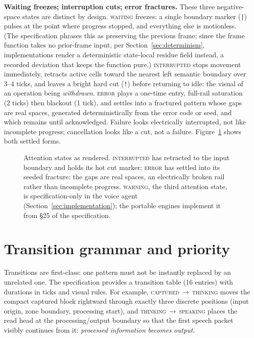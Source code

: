 \documentclass[11pt]{article}
\newcommand{\railstate}[1]{\textsc{#1}}
\begin{document}
\textbf{Waiting freezes; interruption cuts; error fractures.} These three
negative-space states are distinct by design. \railstate{waiting}
freezes: a single boundary marker (\texttt{|}) pulses at the point where
progress stopped, and everything else is motionless. (The specification
phrases this as preserving the previous frame; since the frame function
takes no prior-frame input, per Section~\ref{sec:determinism}, implementations
render a deterministic state-local residue field instead, a recorded
deviation that keeps the function pure.) \railstate{interrupted} stops movement immediately, retracts
active cells toward the nearest left semantic boundary over 3--4 ticks,
and leaves a bright hard cut (\texttt{!}) before returning to idle: the
visual of an operation being \emph{withdrawn}. \railstate{error} plays a
one-time entry, full-rail saturation (2 ticks) then blackout (1 tick), and
settles into a fractured pattern whose gaps are real spaces, generated
deterministically from the error code or seed, and which remains until
acknowledged. Failure looks electrically interrupted, not like incomplete
progress; cancellation looks like a cut, not a failure.
Figure~\ref{fig:attention} shows both settled forms.

\begin{figure}[t]
\centering
{\setlength{\fboxsep}{10pt}%
\colorbox{railbg}{\parbox{\dimexpr\linewidth-20pt\relax}{%
\railfont\footnotesize
}}}
\caption{Attention states as rendered. \railstate{interrupted} has
retracted to the input boundary and holds its hot cut marker;
\railstate{error} has settled into its seeded fracture: the gaps are
real spaces, an electrically broken rail rather than incomplete
progress. \railstate{warning}, the third attention state, is
specification-only in the voice agent
(Section~\ref{sec:implementation}); the portable engines implement it
from \S25 of the specification.}
\label{fig:attention}
\end{figure}

\section{Transition grammar and priority}
\label{sec:transitions}

Transitions are first-class: one pattern must not be instantly replaced
by an unrelated one. The specification provides a transition table (16
entries) with durations in ticks and visual rules. For example,
\railstate{captured}\,$\rightarrow$\,\railstate{thinking} moves the
compact captured block rightward through exactly three discrete positions
(input origin, zone boundary, processing start), and
\railstate{thinking}\,$\rightarrow$\,\railstate{speaking} places the read
head at the processing/output boundary so that the first speech packet
visibly continues from it: \emph{processed information becomes output}.
\end{document}
